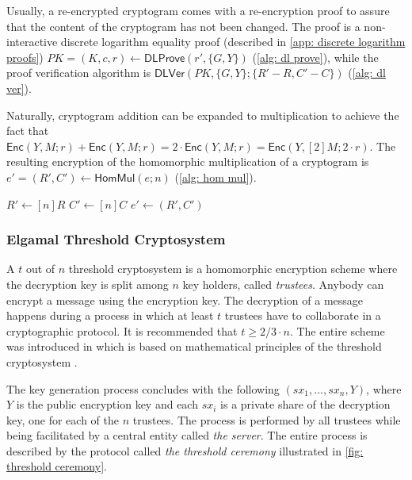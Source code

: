 Usually, a re-encrypted cryptogram comes with a re-encryption proof to assure that the content of the cryptogram has not been changed. The proof is a non-interactive discrete logarithm equality proof (described in \cref{app: discrete logarithm proofs}) $PK = (K, c, r) \gets \mathsf{DLProve} (r', \{ G, Y \})$ (\cref{alg: dl prove}), while the proof verification algorithm is $\mathsf{DLVer} (PK, \{ G, Y \}; \{ R'-R, C'-C \})$ (\cref{alg: dl ver}).

Naturally, cryptogram addition can be expanded to multiplication to achieve the fact that $\mathsf{Enc}(Y, M; r) + \mathsf{Enc}(Y, M; r) = 2 \cdot \mathsf{Enc}(Y, M; r) = \mathsf{Enc}(Y, [2]M; 2 \cdot r)$. The resulting encryption of the homomorphic multiplication of a cryptogram is $e' = (R', C') \gets \mathsf{HomMul}(e; n)$ (\cref{alg: hom mul}).

\begin{algorithm}[ht]
    \DontPrintSemicolon
    \caption{$\mathsf{HomMul} (e; n)$}
    \label{alg: hom mul}
    
    $R' \gets [n]R$ \;
    $C' \gets [n]C$ \;
    $e' \gets (R', C')$ \;
     
\end{algorithm}


\subsubsection{Elgamal Threshold Cryptosystem} \label{app: elgamal threshold cryptosystem}
A $t$ out of $n$ threshold cryptosystem is a homomorphic encryption scheme where the decryption key is split among $n$ key holders, called \textit{trustees}. Anybody can encrypt a message using the encryption key. The decryption of a message happens during a process in which at least $t$ trustees have to collaborate in a cryptographic protocol. It is recommended that $t \geq 2/3 \cdot n$. The entire scheme was introduced in \cite{Pedersen91} which is based on mathematical principles of the threshold cryptosystem \cite{Desmedt89, Shamir79}.

The key generation process concludes with the following $(sx_1, ..., sx_n, Y)$, where $Y$ is the public encryption key and each $sx_i$ is a private share of the decryption key, one for each of the $n$ trustees. The process is performed by all trustees while being facilitated by a central entity called \textit{the server}. The entire process is described by the protocol called \textit{the threshold ceremony} illustrated in \cref{fig: threshold ceremony}.

